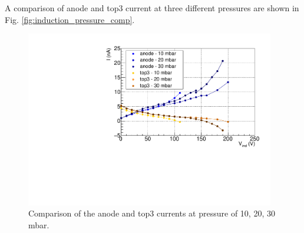 \documentclass[a4paper, 11 pt]{report}
\newcommand{\Vind}{$\Delta V_{ind}$}
\begin{document}

A comparison of anode and top3 current at three different pressures are shown in Fig. 
\ref{fig:induction_pressure_comp}.
\begin{figure}[!htb]
	\centering
	  \includegraphics[width=0.97\textwidth]{Immagini/InductionScan_FULL_AnodeComp_2.pdf}
	\caption{Comparison of the anode and top3 currents at pressure of 10, 20, 30 mbar.}
	\label{fig:induction_pressure_comps}
\end{figure}

\clearpage
\end{document}
